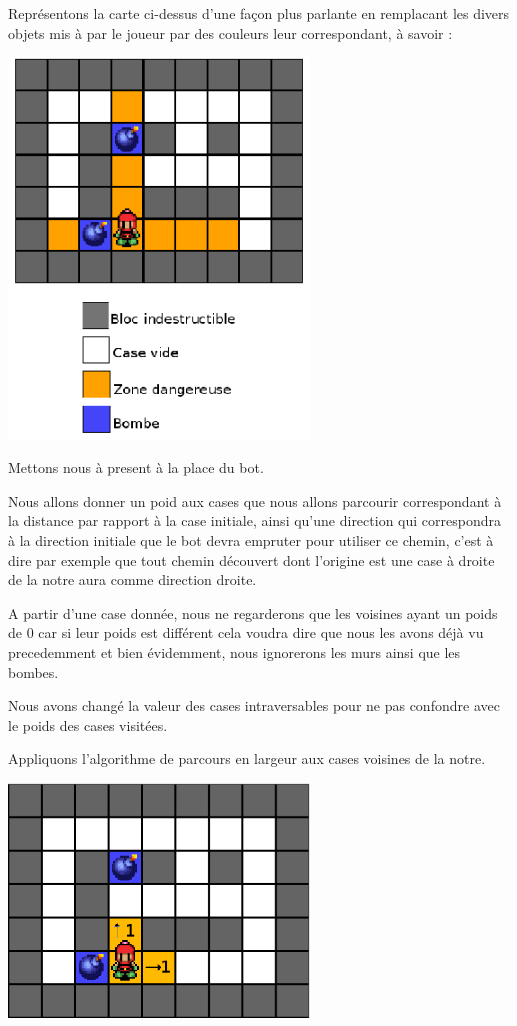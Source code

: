 			Représentons la carte ci-dessus d'une façon plus parlante en remplacant les
			divers objets mis à par le joueur par des couleurs leur correspondant, à
			savoir :
			
			\begin{center}
				\includegraphics[width=8cm]{./Analyse/Img/largeur_1.eps}
			\end{center}
			
			Mettons nous à present à la place du \gls{bot}.
			
			Nous allons donner un poid aux cases que nous allons parcourir
			correspondant à la distance par rapport à la case initiale, ainsi qu'une
			direction qui correspondra à la direction initiale que le \gls{bot} devra empruter
			pour utiliser ce chemin, c'est à dire par exemple que tout chemin découvert
			dont l'origine est une case à droite de la notre aura comme direction droite.
			
			A partir d'une case donnée, nous ne regarderons que les voisines ayant un poids de 0
			car si leur poids est différent cela voudra dire que nous les avons déjà vu precedemment et bien évidemment,
			nous ignorerons les murs ainsi que les bombes.
			
			Nous avons changé la valeur des cases intraversables pour ne pas confondre avec le poids des cases visitées.			
			
			Appliquons l'algorithme de parcours en largeur aux cases voisines de la notre.
			
			
			\begin{center}
				\includegraphics[width=8cm]{./Analyse/Img/largeur_2.eps}
			\end{center}
			
